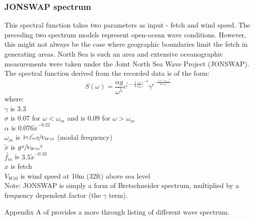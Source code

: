 \subsubsection{JONSWAP spectrum} \label{JONSWAP spectrum}
This spectral function takes two parameters as input - fetch and wind speed. The 
preceding two spectrum models represent open-ocean wave conditions. However, 
this might not always be the case where geographic boundaries limit the fetch in
generating areas. North Sea is such an area and extensive oceanographic
measurements were taken under the Joint North Sea Wave Project (JONSWAP). The
spectral function derived from the recorded data is of the form: 
\begin{equation}
  S(\omega) = \frac{\alpha g}{\omega^{5}} 
  e^{
    {
    \big[ 
      -\frac{5}{4} \frac{\omega}{\omega_m} 
    \big]
    }^{-4}
  }
  \gamma^{
    e^{
        -\frac{(\omega -\omega_m)^2}{2 \sigma^2 {\omega_m}^2}
      }
    }
  \label {eq: JONSWAP spectrum}
\end{equation}
where:\\
$\gamma$ is 3.3\\
$\sigma$ is 0.07 for $\omega < \omega_m$ and is 0.09 for $\omega > \omega_m$\\
$\alpha$ is $0.076 {\tilde{x}}^{-0.22}$\\
$\omega_m $ is $ \sfrac{2 \pi \tilde{f_m} g}{V_{W10}}$ (modal frequency)\\
$\tilde{x}$ is $g \sfrac{x}{{V_{W10}}^2}$\\
$\tilde{f_m}$ is $3.5 {\tilde{x}}^{-0.33}$ \\
$x$ is fetch \\
$V_{W10}$ is wind speed at 10m (32ft) above sea level\\

Note: JONSWAP is simply a form of Bretschneider spectrum, multiplied by a
frequency dependent factor (the $\gamma$ term).

Appendix A of \cite{stansberg2002specialist} provides a more through listing of
different wave spectrum.

